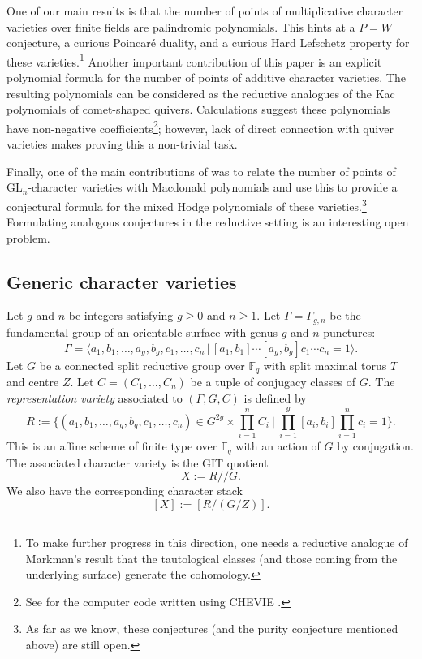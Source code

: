 \documentclass[12pt]{amsart}
\theoremstyle{plain}
\theoremstyle{definition}
\theoremstyle{remark}
\newcommand{\bX}{{X}}
\newcommand{\GL}{\mathrm{GL}}
\newcommand{\bR}{R}
\newcommand{\Fq}{\mathbb{F}_q}
\begin{document}
One of our main results is that the number of points of multiplicative character varieties over finite fields are palindromic polynomials. This hints at a $P=W$ conjecture, a curious Poincaré duality, and a curious Hard Lefschetz property for these varieties.\footnote{To make further progress in this direction, one needs a reductive analogue of Markman's result \cite{MarkmanGenerators2001} that the tautological classes (and those coming from the underlying surface) generate the cohomology.} Another important contribution of this paper is an explicit polynomial formula for the number of points of additive character varieties.  The resulting polynomials can be considered as the reductive analogues of the Kac polynomials of comet-shaped quivers. Calculations suggest these polynomials have non-negative coefficients\footnote{See \cite{Bailey} for the computer code written using CHEVIE \cite{GHLMP96,Michel15}.}; however, lack of direct connection with quiver varieties makes proving this a non-trivial task.

Finally, one of the main contributions of \cite{HRV08, HLRV11} was to relate the number of points of $\GL_n$-character varieties with Macdonald polynomials and use this to provide a conjectural formula for the mixed Hodge polynomials of these varieties.\footnote{As far as we know, these conjectures (and the purity conjecture mentioned above) are still open.} Formulating analogous conjectures in the reductive setting is an interesting open problem.

\newpage 




\subsection{Generic character varieties} \label{s:main}

Let $g$ and $n$ be integers satisfying $g\geq 0$ and $n\geq 1$. Let  $\Gamma=\Gamma_{g,n}$ be the fundamental group of an orientable surface with genus $g$ and $n$ punctures:
\[
\Gamma = {\langle a_1,b_1,\ldots,a_g,b_g,c_1,\ldots,c_n\,|\, {[a_1,b_1]\cdots[a_g,b_g]c_1\cdots c_n}=1\rangle}.
\]
Let $G$ be a connected split reductive group over $\Fq$ with split maximal torus $T$ and centre $Z$.  Let $C=(C_1,\ldots, C_n)$ be a tuple of conjugacy classes of $G$. 
 The \emph{representation variety} associated to $(\Gamma, G, C)$ is defined by 
\[
\bR :=  \bigg\{(a_1,b_1,\ldots ,a_g,b_g, c_1,\ldots ,c_n)\in G^{2g}\times \prod_{i=1}^n C_i\ \bigg|\  
\prod_{i=1}^g [a_i,b_i]\prod_{i=1}^n c_i = 1 \bigg\}.
\]
This is an affine scheme of finite type over $\Fq$ with an action of $G$ by conjugation. The associated character variety is the GIT quotient
\[
\bX:=\bR/\!\!/G. 
\]
We also have the corresponding character stack 
\[ [\bX]:=[\bR/(G/Z)].
\]
\end{document}

